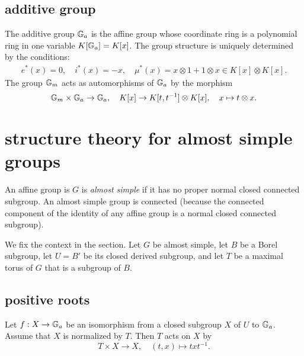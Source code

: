 

\subsection{additive group}

The additive group ${\Bbb G}_a$ is the affine group whose coordinate ring is
a polynomial ring in one variable $K[{\Bbb G}_a] = K[x]$.  The group
structure is uniquely determined by the conditions:
\begin{align*}
  e^*(x)=0,\quad i^*(x)= -x,\quad
  \mu^*(x) = x\otimes 1 + 1\otimes x\in K[x]\otimes K[x].
\end{align*}
The group ${\Bbb G}_m$ acts as automorphisms of ${\Bbb G}_a$ by the morphism
\[
{\Bbb G}_m\times {\Bbb G}_a\to {\Bbb G}_a,\quad K[x]\to K[t,t^{-1}]\otimes K[x],
\quad x\mapsto t\otimes x.
\]

\section{structure theory for almost simple groups}

An affine group is $G$ is {\it almost simple} if it has no proper normal
closed connected subgroup.  An almost simple group is connected
(because the connected component of the identity of any affine group
is a normal closed connected subgroup).

We fix the context in the section.  Let $G$ be almost simple, let $B$
be a Borel subgroup, let $U = B'$ be its closed derived subgroup, and
let $T$ be a maximal torus of $G$ that is a subgroup of $B$.

\subsection{positive roots}

Let $f:X\to {\Bbb G}_a$ be an isomorphism from a
closed subgroup $X$ of $U$ to ${\Bbb G}_a$.  Assume that $X$ is normalized by
$T$. Then $T$ acts on $X$ by
\[
T \times X \to X,\quad  (t,x) \mapsto t x t^{-1}.
\]

